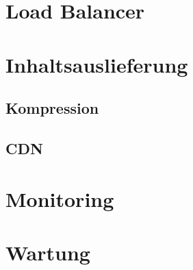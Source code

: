 \section{Load Balancer}

\section{Inhaltsauslieferung}

\subsection{Kompression}
\subsection{CDN}

\section{Monitoring}

\section{Wartung}


